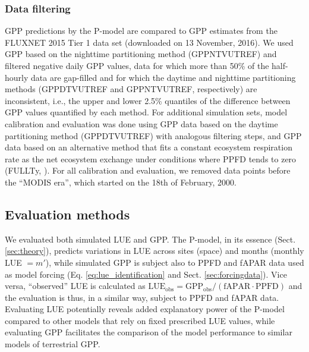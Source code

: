 \documentclass{myreport}
\begin{document}
\label{sec:sites}

\subsubsection{Data filtering}
\label{sec:datafiltering}
GPP predictions by the P-model are compared to GPP estimates from the FLUXNET 2015 Tier 1 data set (downloaded on 13 November, 2016). We used GPP based on the nighttime partitioning method \citep{Reichstein2005-mp} (GPP\textunderscore NT\textunderscore VUT\textunderscore REF) and filtered negative daily GPP values, data for which more than 50\% of the half-hourly data are gap-filled and for which the daytime and nighttime partitioning methods (GPP\textunderscore DT\textunderscore VUT\textunderscore REF and GPP\textunderscore NT\textunderscore VUT\textunderscore REF, respectively) are inconsistent, i.e., the upper and lower 2.5\% quantiles of the difference between GPP values quantified by each method. For additional simulation sets, model calibration and evaluation was done using GPP data based on the daytime partitioning method (GPP\textunderscore DT\textunderscore VUT\textunderscore REF) \citep{lasslop10} with analogous filtering steps, and GPP data based on an alternative method that fits a constant ecosystem respiration rate as the net ecosystem exchange under conditions where PPFD tends to zero (FULL\textunderscore Ty, \citet{wang17natpl}). For all calibration and evaluation, we removed data points before the ``MODIS era'', which started on the 18th of February, 2000.

\subsection{Evaluation methods}
\label{sec:methods_eval}

We evaluated both simulated LUE and GPP. The P-model, in its essence (Sect. \ref{sec:theory}), predicts variations in LUE across sites (space) and months (monthly LUE $= m'$), while simulated GPP is subject also to PPFD and fAPAR data used as model forcing (Eq. \ref{eq:lue_identification} and Sect. \ref{sec:forcingdata}). Vice versa, ``observed'' LUE is calculated as $\text{LUE}_\text{obs} = \text{GPP}_\text{obs} / (\text{fAPAR} \cdot \text{PPFD})$ and the evaluation is thus, in a similar way, subject to PPFD and fAPAR data. Evaluating LUE potentially reveals added explanatory power of the P-model compared to other models that rely on fixed prescribed LUE values, while evaluating GPP facilitates the comparison of the model performance to similar models of terrestrial GPP.
\end{document}

